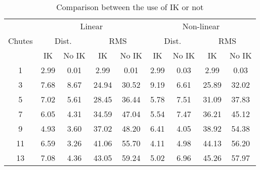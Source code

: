 \documentclass[11pt, a4paper]{article}
\begin{document}
\begin{table*}[]
  \caption{Comparison between the use of IK or not}
  \centering
  \begin{tabular}{ccccc|cccc}
  \hline
  & \multicolumn{4}{c}{Linear} & \multicolumn{4}{c}{Non-linear}\\
  \multicolumn{1}{c}{Chutes} & \multicolumn{2}{c}{Dist.} & \multicolumn{2}{c}{RMS} & \multicolumn{2}{c}{Dist.} & \multicolumn{2}{c}{RMS}\\
  \multicolumn{1}{l}{}  & IK & No IK & IK & No IK & IK & No IK & IK & No IK \\ \hline
  1   & 2.99 & 0.01 & 2.99  & 0.01  & 2.99 & 0.03 & 2.99  & 0.03  \\
  3   & 7.68 & 8.67 & 24.94 & 30.52 & 9.19 & 6.61 & 25.89 & 32.02 \\
  5   & 7.02 & 5.61 & 28.45 & 36.44 & 5.78 & 7.51 & 31.09 & 37.83 \\
  7   & 6.05 & 4.31 & 34.59 & 47.04 & 5.54 & 7.47 & 36.21 & 45.12 \\
  9   & 4.93 & 3.60 & 37.02 & 48.20 & 6.41 & 4.05 & 38.92 & 54.38 \\
  11  & 6.59 & 3.26 & 41.06 & 55.70 & 4.11 & 4.98 & 44.13 & 56.20 \\
  13  & 7.08 & 4.36 & 43.05 & 59.24 & 5.02 & 6.96 & 45.26 & 57.97 \\
  \hline
  \end{tabular}
  \label{IK_comparison}
\end{table*}
  
\end{document}
